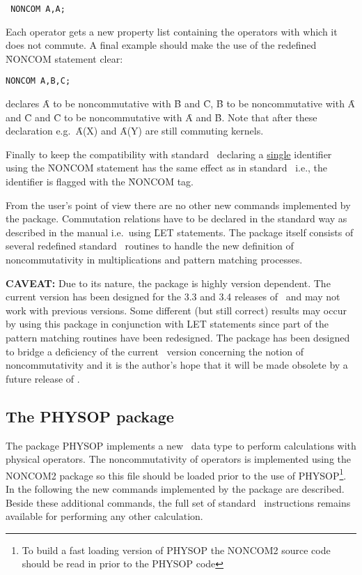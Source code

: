 \begin{verbatim}
 NONCOM A,A;
\end{verbatim}
Each operator gets a new property list containing the
operators with which it does not commute.
A final example should make
the use of the redefined \f{NONCOM} statement clear: 

\begin{verbatim}
NONCOM A,B,C;
\end{verbatim}
declares \f{A}  to be noncommutative with \f{B} and \f{C},
\f{B} to be noncommutative
with \f{A} and \f{C} and \f{C} to be noncommutative
with \f{A} and \f{B}.
Note that after these declaration
e.g.\ \f{A(X)} and \f{A(Y)}
are still commuting kernels.

Finally to keep the compatibility with standard \REDUCE\, declaring a
\underline{single} identifier using the \f{NONCOM} statement has the same
effect as in
standard \REDUCE\, i.e., the identifier is flagged with the \f{NONCOM} tag.

From the user's point of view there are no other
new commands implemented by the package. Commutation
relations have to be declared in the standard way as described in
the manual i.e.\ using
\f{LET} statements. The package itself consists of several redefined
standard
\REDUCE\ routines to handle the new definition of noncommutativity in
multiplications and pattern matching processes.

\textbf{CAVEAT: } Due to its nature, the package is highly version
dependent. The current version has been designed for the 3.3  and 3.4
releases
of \REDUCE\ and may not work with previous versions. Some different
(but still correct) results may occur by using this package in
conjunction with
LET statements since part of the pattern matching routines have been
redesigned. The package has been designed to bridge a deficiency of the
current \REDUCE\ version concerning the notion of noncommutativity
 and it is the author's hope that it will be made  obsolete
by a future release of \REDUCE.

\subsection{The PHYSOP package}

The package PHYSOP implements a new \REDUCE\ data type to perform
calculations with physical operators. The noncommutativity of
operators is
implemented using the NONCOM2 package so this file should be loaded
prior to the use of PHYSOP\footnote{To build a fast
loading version of PHYSOP the NONCOM2
source code should be read in prior to the PHYSOP
code}.
In the following the new commands  implemented by the package
are described.  Beside these additional commands,
the full set of standard \REDUCE\ instructions remains
available for performing  any other calculation.


